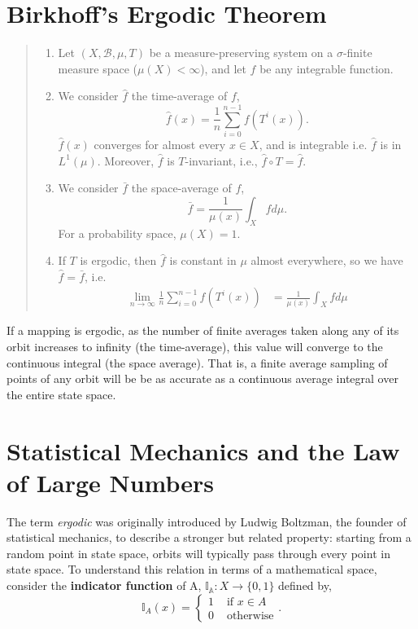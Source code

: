 \documentclass{article}
\begin{document}
\section{Birkhoff’s Ergodic Theorem}
\begin{quote}
    \begin{enumerate}
        \item
        Let $(X, \mathcal B, \mu, T)$ be a measure-preserving system on a $\sigma$-finite measure space ($\mu(X)< \infty$), and let $f$ be any integrable function.
        
        \item
        We consider $\hat f$ the time-average of $f$,
        \[
            \hat f(x) = \frac{1}{n}\sum_{i=0}^{n-1} f(T^{i}(x)).
        \]
        $\hat f(x)$ converges for almost every $x \in X$, and is integrable i.e. $\hat f$ is in $L^1(\mu)$. Moreover, $\hat f$ is $T$-invariant, i.e., $ \hat f \circ T = \hat f$.
        
        \item
        We consider $\bar f$ the space-average of $f$,
        \[
            \bar f = \frac{1}{\mu(x)} \int_{X} f d\mu.
        \]
        For a probability space, $\mu (X)=1$.
        
        \item
        If $T$ is ergodic, then $\hat f$ is constant in $\mu$ almost everywhere, so we have $\hat f = \bar f$, i.e.
        \begin{align*}
            \displaystyle \lim_{n\to \infty} \frac{1}{n}\sum_{i=0}^{n-1}f(T^{i}(x)) &= \frac{1}{\mu(x)} \int_{X} f d \mu 
        \end{align*}
    \end{enumerate}
      
\end{quote}

If a mapping is ergodic, as the number of finite averages taken along any of its orbit increases to infinity (the time-average), this value will converge to the continuous integral (the space average). That is, a finite average sampling of points of any orbit will be be as accurate as a continuous average integral over the entire state space.

\section{Statistical Mechanics and the Law of Large Numbers}
The term \emph{ergodic} was originally introduced by Ludwig Boltzman, the founder of statistical mechanics, to describe a stronger but related property: starting from a random point in state space, orbits will typically pass through every point in state space. To understand this relation in terms of a mathematical space, consider the \textbf{indicator function} of A, $\mathbb{I_A} :X \to \{0,1\}$ defined by,
\[
	\mathbb I_A(x) = \begin{cases}
		1 &\text{ if $x\in A$}\\ 0 &\text{ otherwise}
	\end{cases}.
\]
\end{document}
